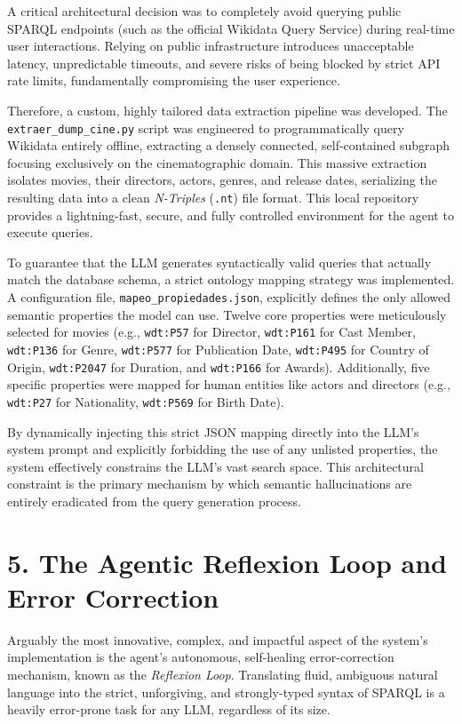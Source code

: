 A critical architectural decision was to completely avoid querying public SPARQL endpoints (such as the official Wikidata Query Service) during real-time user interactions. Relying on public infrastructure introduces unacceptable latency, unpredictable timeouts, and severe risks of being blocked by strict API rate limits, fundamentally compromising the user experience.

Therefore, a custom, highly tailored data extraction pipeline was developed. The \texttt{extraer\_dump\_cine.py} script was engineered to programmatically query Wikidata entirely offline, extracting a densely connected, self-contained subgraph focusing exclusively on the cinematographic domain. This massive extraction isolates movies, their directors, actors, genres, and release dates, serializing the resulting data into a clean \textit{N-Triples} (\texttt{.nt}) file format. This local repository provides a lightning-fast, secure, and fully controlled environment for the agent to execute queries.

To guarantee that the LLM generates syntactically valid queries that actually match the database schema, a strict ontology mapping strategy was implemented. A configuration file, \texttt{mapeo\_propiedades.json}, explicitly defines the only allowed semantic properties the model can use. Twelve core properties were meticulously selected for movies (e.g., \texttt{wdt:P57} for Director, \texttt{wdt:P161} for Cast Member, \texttt{wdt:P136} for Genre, \texttt{wdt:P577} for Publication Date, \texttt{wdt:P495} for Country of Origin, \texttt{wdt:P2047} for Duration, and \texttt{wdt:P166} for Awards). Additionally, five specific properties were mapped for human entities like actors and directors (e.g., \texttt{wdt:P27} for Nationality, \texttt{wdt:P569} for Birth Date).

By dynamically injecting this strict JSON mapping directly into the LLM's system prompt and explicitly forbidding the use of any unlisted properties, the system effectively constrains the LLM's vast search space. This architectural constraint is the primary mechanism by which semantic hallucinations are entirely eradicated from the query generation process.

\section*{5. The Agentic Reflexion Loop and Error Correction}

Arguably the most innovative, complex, and impactful aspect of the system's implementation is the agent's autonomous, self-healing error-correction mechanism, known as the \textit{Reflexion Loop}. Translating fluid, ambiguous natural language into the strict, unforgiving, and strongly-typed syntax of SPARQL is a heavily error-prone task for any LLM, regardless of its size.

